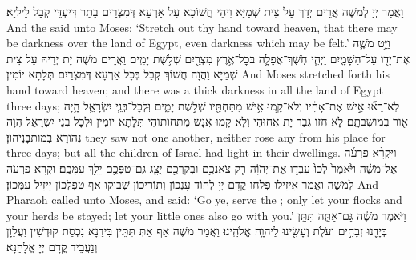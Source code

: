 {וַאֲמַר יְיָ לְמֹשֶׁה אֲרֵים יְדָךְ עַל צֵית שְׁמַיָּא וִיהֵי חֲשׁוֹכָא עַל אַרְעָא דְּמִצְרָיִם בָּתַר דְּיִעְדֵּי קְבַל לֵילְיָא׃}
{And the \lord\space said unto Moses: ‘Stretch out thy hand toward heaven, that there may be darkness over the land of Egypt, even darkness which may be felt.’}{}
{וַיֵּ֥ט מֹשֶׁ֛ה אֶת־יָד֖וֹ עַל־הַשָּׁמָ֑יִם וַיְהִ֧י חֹֽשֶׁךְ־אֲפֵלָ֛ה בְּכׇל־אֶ֥רֶץ מִצְרַ֖יִם שְׁלֹ֥שֶׁת יָמִֽים׃
}
{וַאֲרֵים מֹשֶׁה יָת יְדֵיהּ עַל צֵית שְׁמַיָּא וַהֲוָה חֲשׁוֹךְ קְבַל בְּכָל אַרְעָא דְּמִצְרַיִם תְּלָתָא יוֹמִין׃}
{And Moses stretched forth his hand toward heaven; and there was a thick darkness in all the land of Egypt three days;}{}
{לֹֽא־רָא֞וּ אִ֣ישׁ אֶת־אָחִ֗יו וְלֹא־קָ֛מוּ אִ֥ישׁ מִתַּחְתָּ֖יו שְׁלֹ֣שֶׁת יָמִ֑ים וּֽלְכׇל־בְּנֵ֧י יִשְׂרָאֵ֛ל הָ֥יָה א֖וֹר בְּמוֹשְׁבֹתָֽם׃}
{לָא חֲזוֹ גְּבַר יָת אֲחוּהִי וְלָא קָמוּ אֲנָשׁ מִתְּחוֹתוֹהִי תְּלָתָא יוֹמִין וּלְכָל בְּנֵי יִשְׂרָאֵל הֲוָה נְהוֹרָא בְּמוֹתְבָנֵיהוֹן׃}
{they saw not one another, neither rose any from his place for three days; but all the children of Israel had light in their dwellings.}{}
{וַיִּקְרָ֨א פַרְעֹ֜ה אֶל־מֹשֶׁ֗ה וַיֹּ֙אמֶר֙ לְכוּ֙ עִבְד֣וּ אֶת־יְהֹוָ֔ה רַ֛ק צֹאנְכֶ֥ם וּבְקַרְכֶ֖ם יֻצָּ֑ג גַּֽם־טַפְּכֶ֖ם יֵלֵ֥ךְ עִמָּכֶֽם׃
}
{וּקְרָא פַרְעֹה לְמֹשֶׁה וַאֲמַר אִיזִילוּ פְלַחוּ קֳדָם יְיָ לְחוֹד עָנְכוֹן וְתוֹרֵיכוֹן שְׁבוּקוּ אַף טַפְלְכוֹן יֵיזֵיל עִמְּכוֹן׃}
{And Pharaoh called unto Moses, and said: ‘Go ye, serve the \lord; only let your flocks and your herds be stayed; let your little ones also go with you.’}{}
{וַיֹּ֣אמֶר מֹשֶׁ֔ה גַּם־אַתָּ֛ה תִּתֵּ֥ן בְּיָדֵ֖נוּ זְבָחִ֣ים וְעֹלֹ֑ת וְעָשִׂ֖ינוּ לַיהֹוָ֥ה אֱלֹהֵֽינוּ׃
}
{וַאֲמַר מֹשֶׁה אַף אַתְּ תִּתֵּין בִּידַנָא נִכְסַת קוּדְשִׁין וַעֲלָוָן וְנַעֲבֵיד קֳדָם יְיָ אֱלָהַנָא׃}
